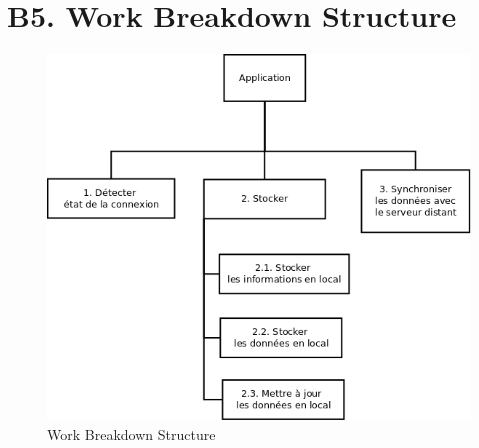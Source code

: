 \section{B5. Work Breakdown Structure}

 \begin{figure}[H]
  \centering
  \includegraphics[width=18cm]{./images/wbs.png}
  \caption{Work Breakdown Structure}
 \end{figure}
